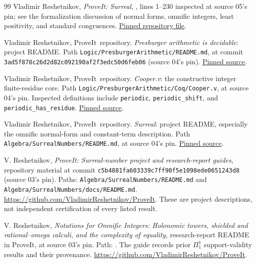 \documentclass[11pt]{article}
\numberwithin{equation}{section}
\theoremstyle{definition}
\theoremstyle{remark}
\newcommand{\code}[1]{\texttt{\small #1}}
\newcommand{\repo}{\textsf{ProveIt}}
\begin{document}
\begin{thebibliography}{99}
Vladimir Reshetnikov, \emph{ProveIt: Surreal},
, lines 1--230 inspected at source 05's
pin; see the formalization discussion of normal forms, omnific integers,
least positivity, and standard congruences.
\href{https://github.com/VladimirReshetnikov/ProveIt/blob/a11efab09a2d08f692a09829cb6d3440ddd1795a/Algebra/SurrealNumbers/README.md}{Pinned repository file}.

Vladimir Reshetnikov, \repo\ repository.
\emph{Presburger arithmetic is decidable}: project README.
Path \code{Logic/PresburgerArithmetic/README.md},
at commit \code{3ad5f878c26d2d82c092190af2f3edc50d6feb06} (source 04's pin).
\href{https://github.com/VladimirReshetnikov/ProveIt/blob/3ad5f878c26d2d82c092190af2f3edc50d6feb06/Logic/PresburgerArithmetic/README.md}{Pinned source}.

Vladimir Reshetnikov, \repo\ repository.
\emph{Cooper.v}: the constructive integer finite-residue core.
Path \code{Logic/PresburgerArithmetic/Coq/Cooper.v}, at source 04's pin.
Inspected definitions include \code{periodic}, \code{periodic\_shift}, and
\code{periodic\_has\_residue}.
\href{https://github.com/VladimirReshetnikov/ProveIt/blob/3ad5f878c26d2d82c092190af2f3edc50d6feb06/Logic/PresburgerArithmetic/Coq/Cooper.v}{Pinned source}.

Vladimir Reshetnikov, \repo\ repository.
\emph{Surreal}: project README, especially the omnific normal-form and
constant-term description.
Path \code{Algebra/SurrealNumbers/README.md}, at source 04's pin.
\href{https://github.com/VladimirReshetnikov/ProveIt/blob/3ad5f878c26d2d82c092190af2f3edc50d6feb06/Algebra/SurrealNumbers/README.md}{Pinned source}.

V. Reshetnikov, \emph{ProveIt: Surreal-number project and research-report guides},
repository material at commit
\texttt{c5b4881fa603339c7ff90f5e1098ede0651243d8} (source 03's pin).
Paths: \texttt{Algebra/SurrealNumbers/README.md} and
\texttt{Algebra/SurrealNumbers/docs/README.md}.
\url{https://github.com/VladimirReshetnikov/ProveIt}.
These are project descriptions, not independent certification of every
listed result.

V. Reshetnikov, \emph{Notations for Omnific Integers: Holonomic towers,
shielded and rational--omega calculi, and the complexity of equality},
research-report README in ProveIt, at source 03's pin. Path:
.
The guide records prior $\Pi^1_1$ support-validity results and their provenance.
\url{https://github.com/VladimirReshetnikov/ProveIt}.


\end{thebibliography}
\end{document}
